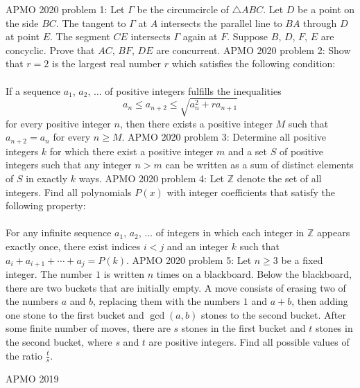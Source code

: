 APMO 2020 problem 1:  Let $\Gamma$ be the circumcircle of $\triangle ABC$. Let $D$ be a point on the side $BC$. The tangent to $\Gamma$ at $A$ intersects the parallel line to $BA$ through $D$ at point $E$. The segment $CE$ intersects $\Gamma$ again at $F$. Suppose $B$, $D$, $F$, $E$ are concyclic. Prove that $AC$, $BF$, $DE$ are concurrent. 
APMO 2020 problem 2:  Show that $r = 2$ is the largest real number $r$ which satisfies the following condition: \\\\
If a sequence $a_1$, $a_2$, $\ldots$ of positive integers fulfills the inequalities
\[ a_n \leq a_{n+2} \leq\sqrt{a_n^2+ra_{n+1}} \]
for every positive integer $n$, then there exists a positive integer $M$ such that $a_{n+2} = a_n$ for every $n \geq M$. 
APMO 2020 problem 3:  Determine all positive integers $k$ for which there exist a positive integer $m$ and a set $S$ of positive integers such that any integer $n > m$ can be written as a sum of distinct elements of $S$ in exactly $k$ ways. 
APMO 2020 problem 4:  Let $\mathbb{Z}$ denote the set of all integers. Find all polynomials $P(x)$ with integer coefficients that satisfy the following property: \\\\
For any infinite sequence $a_1$, $a_2$, $\dotsc$ of integers in which each integer in $\mathbb{Z}$ appears exactly once, there exist indices $i < j$ and an integer $k$ such that $a_i +a_{i+1} +\dotsb +a_j = P(k)$. 
APMO 2020 problem 5:  Let $n \geq 3$ be a fixed integer. The number $1$ is written $n$ times on a blackboard. Below the blackboard, there are two buckets that are initially empty. A move consists of erasing two of the numbers $a$ and $b$, replacing them with the numbers $1$ and $a+b$, then adding one stone to the first bucket and $\gcd(a, b)$ stones to the second bucket. After some finite number of moves, there are $s$ stones in the first bucket and $t$ stones in the second bucket, where $s$ and $t$ are positive integers. Find all possible values of the ratio $\frac{t}{s}$. 

APMO 2019 

